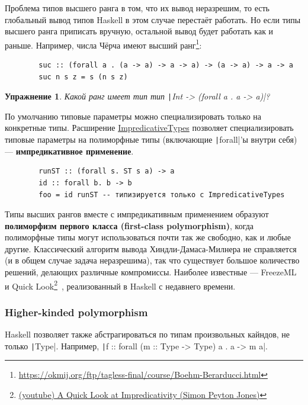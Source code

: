 \documentclass[12pt]{article}
\newcommand{\vocab}[1]{\textbf{#1}} %
\newtheorem{task}{Упражнение}
\begin{document}
    Проблема типов высшего ранга в том, что их вывод неразрешим, то есть глобальный вывод типов Haskell в этом случае перестаёт работать.
    Но если типы высшего ранга приписать вручную, остальной вывод будет работать как и раньше.
    Например, числа Чёрча имеют высший ранг\footnote{\url{https://okmij.org/ftp/tagless-final/course/Boehm-Berarducci.html}}:
    \begin{verbatim}
        suc :: (forall a . (a -> a) -> a -> a) -> (a -> a) -> a -> a
        suc n s z = s (n s z)
    \end{verbatim}

    \begin{task}
        Какой ранг имеет тип тип \texttt|Int -> (forall a . a -> a)|?
    \end{task}

    По умолчанию типовые параметры можно специализировать только на конкретные типы.
    Расширение \href{https://downloads.haskell.org/ghc/latest/docs/users_guide/exts/impredicative_types.html}{ImpredicativeTypes} позволяет специализировать типовые параметры на полиморфные типы (включающие \texttt|forall|'ы внутри себя) --- \vocab{импредикативное применение}.
    \begin{verbatim}
        runST :: (forall s. ST s a) -> a
        id :: forall b. b -> b
        foo = id runST -- типизируется только с ImpredicativeTypes
    \end{verbatim}

    Типы высших рангов вместе с импредикативным применением образуют \vocab{полиморфизм первого класса (first-class polymorphism)}, когда полиморфные типы могут использоваться почти так же свободно, как и любые другие.
    Классический алгоритм вывода Хиндли-Дамаса-Милнера не справляется (и в общем случае задача неразрешима), так что существует большое количество решений, делающих различные компромиссы.
    Наиболее известные --- FreezeML~\cite{emrich2020freezeml} и Quick Look\footnote{\href{https://youtu.be/ZuNMo136QqI?si=qp8PAEeeF-bioCB_}{(youtube) A Quick Look at Impredicativity (Simon Peyton Jones)}}~\cite{serrano2020quick}, реализованный в Haskell с недавнего времени.

    \subsubsection{Higher-kinded polymorphism}

    Haskell позволяет также абстрагироваться по типам произвольных кайндов, не только \texttt|Type|.
    Например, \texttt|f :: forall (m :: Type -> Type) a . a -> m a|.
\end{document}
